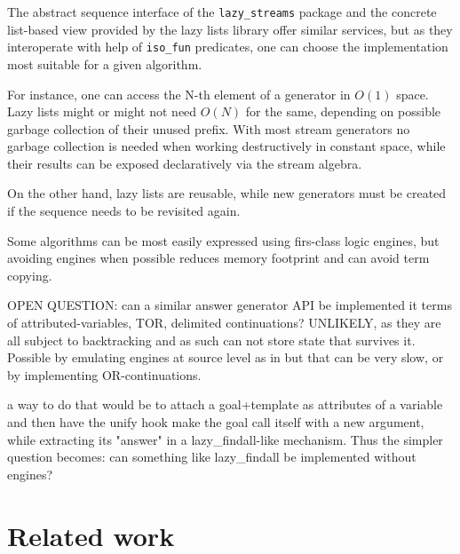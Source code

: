 \documentclass{new_tlp}
\begin{document}
The abstract sequence interface of the {\tt lazy\_streams} package and
the concrete list-based view provided by the lazy lists library offer
similar services, but as they interoperate with help of {\tt iso\_fun} predicates,
one can choose the  implementation most suitable for a given algorithm.

For instance, one  can access the N-th element of a  generator in $O(1)$ space.
Lazy lists might or might not need $O(N)$ for the same, depending on possible garbage collection of their unused prefix.
With most stream generators no garbage collection is needed when working destructively in constant space, while their results can be exposed declaratively via the stream algebra.

On the other hand, lazy lists are reusable, while new generators 
must be created if the sequence needs to be revisited again.

Some algorithms can be most easily expressed using firs-class logic engines, but
avoiding engines when possible reduces memory footprint and can avoid term copying.

{\Large OPEN QUESTION: can a similar answer generator API be implemented
it terms of  attributed-variables, TOR, delimited continuations? 
UNLIKELY, as they are all subject to backtracking and as such can not
store state that survives it. Possible by emulating engines at source level as in
\cite{padl09inter}
but
that can be very slow, or by implementing OR-continuations.
}


 a way to do that would be to attach a goal+template as attributes of a variable
and then have the unify hook make the goal call itself with a new argument, while
extracting its "answer" in a lazy\_findall-like mechanism. Thus the simpler question becomes:
{\large can something like lazy\_findall be implemented without engines?}





\section{Related work}


\begin{comment}
Maybe?
\BI 
\I some history - see
\cite{tarau:parimp99,tarau:cl2000,iclp08:inter,ciclops08:pINTER}
\cite{coord11tarau}
\cite{bp2011}
\I work on delimited continuations \cite{delim}, hookable disjunction \cite{tor}
\I work on pipelines \cite{pipelines}
\EI
\end{comment}
\end{document}
